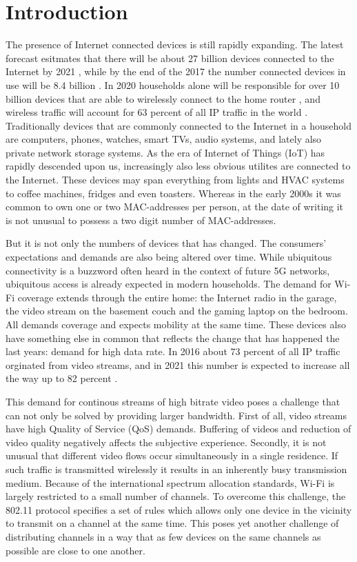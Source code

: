 \chapter{Introduction}
The presence of Internet connected devices is still rapidly expanding. The latest forecast 
esitmates that there will be about 27 billion devices connected to the Internet by 2021 \cite{CiscoVNI2017}, while by the end of the 2017 the number
connected devices in use will be 8.4 billion \cite{Gartner}. In 2020 households alone will be responsible for over 10 billion devices that are
able to wirelessly connect to the home router \cite{wifialliance}, and wireless traffic will account for 63 percent of all IP traffic in the world \cite{CiscoVNI2017}. 
Traditionally devices that are commonly connected to the Internet in a household are computers, phones, watches, smart TVs, audio systems, and lately also private network storage systems.
As the era of Internet of Things (IoT) has rapidly descended upon us, increasingly also less obvious utilites are connected to the Internet.
These devices may span everything from lights and HVAC systems to coffee machines, fridges and even toasters. Whereas in the early 2000s it was common to own 
one or two MAC-addresses per person, at the date of writing it is not unusual to possess a two digit number of MAC-addresses.

But it is not only the numbers of devices that has changed. The consumers' expectations and demands are also being altered over time. 
While ubiquitous connectivity is a buzzword often heard in the context of future 5G networks, ubiquitous access is already expected in
modern households. The demand for Wi-Fi coverage extends through the entire home: the Internet radio in the garage, the video stream on the basement
couch and the gaming laptop on the bedroom. All demands coverage and expects mobility at the same time. These devices also have something else in
common that reflects the change that has happened the last years: demand for high data rate. In 2016 about 73 percent of all IP traffic orginated from video
streams, and in 2021 this number is expected to increase all the way up to 82 percent \cite{CiscoVNI2017}. 

This demand for continous streams of high bitrate video poses a challenge that can not only be solved by providing larger bandwidth. First of all, video streams
have high Quality of Service (QoS) demands. Buffering of videos and reduction of video quality negatively affects the subjective experience.
Secondly, it is not unusual that different video flows occur simultaneously in a single residence. If such traffic is transmitted wirelessly
it results in an inherently busy transmission medium. Because of the international spectrum allocation standards, Wi-Fi is largely restricted to a small number of channels.
To overcome this challenge, the 802.11 protocol specifies a set of rules which allows only one device in the vicinity to transmit on a channel at the same time. 
This poses yet another challenge of distributing channels in a way that as few devices on the same channels as possible are close to one another. 

